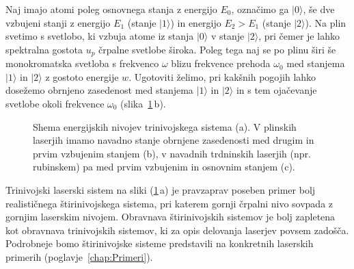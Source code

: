Naj imajo atomi poleg osnovnega stanja z energijo $E_0$, označimo ga $|0\rangle$,
še dve vzbujeni stanji z energijo $E_1$ (stanje $|1\rangle$) in energijo $E_2>E_1$
(stanje $|2\rangle$). Na plin svetimo s svetlobo, ki
vzbuja atome iz stanja $|0\rangle$ v stanje $|2\rangle$, pri čemer
je lahko spektralna gostota $u_{p}$ črpalne svetlobe široka. Poleg
tega naj se po plinu širi še monokromatska svetloba s frekvenco $\omega$
blizu frekvence prehoda $\omega_{0}$ med stanjema $|1\rangle$ in
$|2\rangle$ z gostoto energije $w$. Ugotoviti želimo, pri kakšnih
pogojih lahko dosežemo obrnjeno zasedenost med stanjema $|1\rangle$ in $|2\rangle$
in s tem ojačevanje svetlobe okoli frekvence $\omega_{0}$ (slika~\ref{fig:3nivojski}\,b).
\begin{figure}[h]
\centering
\def\svgwidth{140truemm} 

\caption{Shema energijskih nivojev trinivojskega sistema (a).
V plinskih laserjih imamo navadno stanje obrnjene zasedenosti med drugim in prvim
vzbujenim stanjem (b), v navadnih trdninskih laserjih (npr. rubinskem) pa med 
prvim vzbujenim in osnovnim stanjem (c).}
\label{fig:3nivojski}
\end{figure}
\begin{remark}
Trinivojski laserski sistem na sliki (\ref{fig:3nivojski}\,a) je pravzaprav 
poseben primer bolj realističnega štirinivojskega sistema, 
pri katerem gornji črpalni nivo sovpada z gornjim laserskim nivojem. Obravnava 
štirinivojskih sistemov je bolj zapletena kot obravnava trinivojskih sistemov, 
ki za opis delovanja laserjev povsem zadošča. Podrobneje bomo štirinivojske sisteme predstavili
na konkretnih laserskih primerih (poglavje~\ref{chap:Primeri}).
\end{remark}

